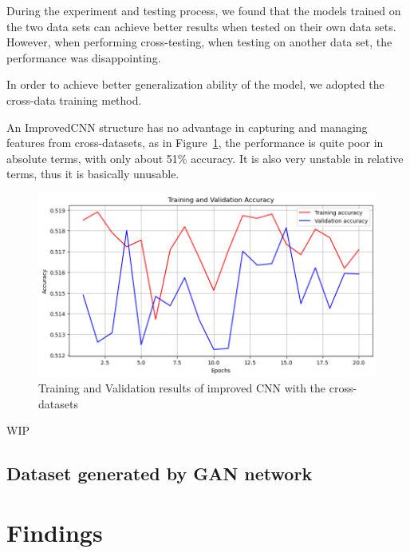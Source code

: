\documentclass[final]{cvpr}
\begin{document}
During the experiment and testing process, we found that the models trained on the two data sets can achieve better results when tested on their own data sets. However, when performing cross-testing, when testing on another data set, the performance was disappointing.

In order to achieve better generalization ability of the model, we adopted the cross-data training method.

An ImprovedCNN structure has no advantage in capturing and managing features from cross-datasets, as in Figure~\ref*{fig:ex-cd-improvedcnn-results}, the performance is quite poor in absolute terms, with only about 51\% accuracy. It is also very unstable in relative terms, thus it is basically unusable.

\begin{figure}[t]
   \centering
   \includegraphics[width=0.9\linewidth]{img/ex-cd-improvedcnn-accuracy-results.png}
   \caption{Training and Validation results of improved CNN with the cross-datasets}
   \label{fig:ex-cd-improvedcnn-results}
\end{figure}

WIP

\subsection{Dataset generated by GAN network}

\section{Findings}


\end{document}
